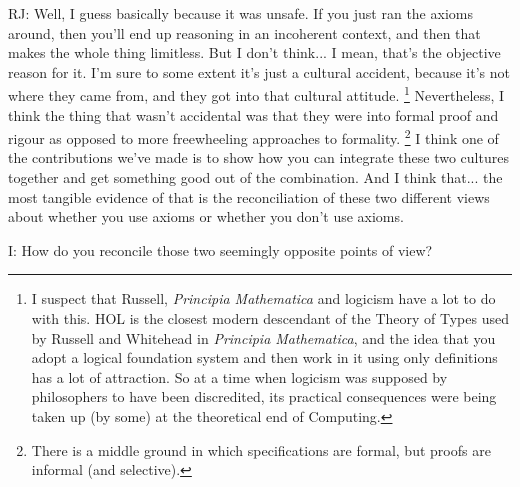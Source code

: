 \documentclass[10pt,titlepage]{book}
\begin{document}
RJ: Well, I guess basically because it was unsafe.
If you just ran the axioms around, then you'll end up reasoning in an incoherent context, and then that makes the whole thing limitless.
But I don't think... I mean, that's the objective reason for it.
I'm sure to some extent it's just a cultural accident, because it's not where they came from, and they got into that cultural attitude.%
\footnote{
I suspect that Russell, {\it Principia Mathematica} and logicism have a lot to do with this.
HOL is the closest modern descendant of the Theory of Types used by Russell and Whitehead in {\it Principia Mathematica}, and the idea that you adopt a logical foundation system and then work in it using only definitions has a lot of attraction.
So at a time when logicism was supposed by philosophers to have been discredited, its practical consequences were being taken up (by some) at the theoretical end of Computing.}%
Nevertheless, I think the thing that wasn't accidental was that they were into formal proof and rigour as opposed to more freewheeling approaches to formality.%
\footnote{
There is a middle ground in which specifications are formal, but proofs are informal (and selective).
}%
I think one of the contributions we've made is to show how you can integrate these two cultures together and get something good out of the combination.
And I think that... the most tangible evidence of that is the reconciliation of these two different views about whether you use axioms or whether you don't use axioms.

I: How do you reconcile those two seemingly opposite points of view?
\end{document}
